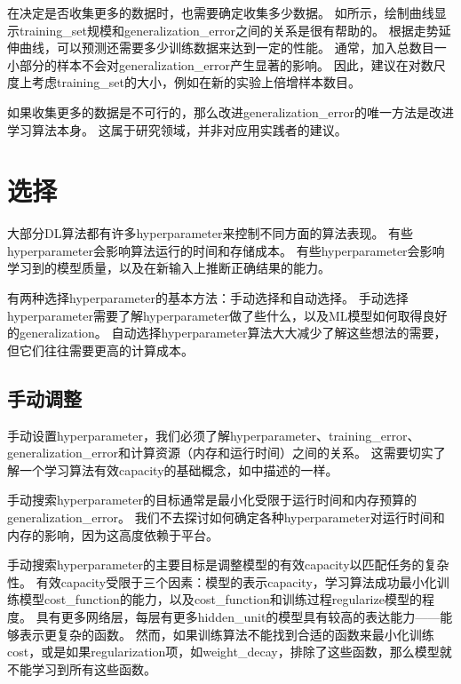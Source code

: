 在决定是否收集更多的数据时，也需要确定收集多少数据。
如所示，绘制曲线显示\gls{training_set}规模和\gls{generalization_error}之间的关系是很有帮助的。
根据走势延伸曲线，可以预测还需要多少训练数据来达到一定的性能。
通常，加入总数目一小部分的样本不会对\gls{generalization_error}产生显著的影响。
因此，建议在对数尺度上考虑\gls{training_set}的大小，例如在新的实验上倍增样本数目。


如果收集更多的数据是不可行的，那么改进\gls{generalization_error}的唯一方法是改进学习算法本身。
这属于研究领域，并非对应用实践者的建议。

\section{选择}
\label{sec:selecting_hyperparameters}
大部分\gls{DL}算法都有许多\gls{hyperparameter}来控制不同方面的算法表现。
有些\gls{hyperparameter}会影响算法运行的时间和存储成本。
有些\gls{hyperparameter}会影响学习到的模型质量，以及在新输入上推断正确结果的能力。


有两种选择\gls{hyperparameter}的基本方法：手动选择和自动选择。
手动选择\gls{hyperparameter}需要了解\gls{hyperparameter}做了些什么，以及\gls{ML}模型如何取得良好的\gls{generalization}。
自动选择\gls{hyperparameter}算法大大减少了解这些想法的需要，但它们往往需要更高的计算成本。


\subsection{手动调整}
\label{sec:manual_hyperparameter_tuning}
手动设置\gls{hyperparameter}，我们必须了解\gls{hyperparameter}、\gls{training_error}、\gls{generalization_error}和计算资源（内存和运行时间）之间的关系。
这需要切实了解一个学习算法有效\gls{capacity}的基础概念，如中描述的一样。


手动搜索\gls{hyperparameter}的目标通常是最小化受限于运行时间和内存预算的\gls{generalization_error}。
我们不去探讨如何确定各种\gls{hyperparameter}对运行时间和内存的影响，因为这高度依赖于平台。


手动搜索\gls{hyperparameter}的主要目标是调整模型的有效\gls{capacity}以匹配任务的复杂性。
有效\gls{capacity}受限于三个因素：模型的表示\gls{capacity}，学习算法成功最小化训练模型\gls{cost_function}的能力，以及\gls{cost_function}和训练过程\gls{regularize}模型的程度。
具有更多网络层，每层有更多\gls{hidden_unit}的模型具有较高的表达能力——能够表示更复杂的函数。
然而，如果训练算法不能找到合适的函数来最小化训练\gls{cost}，或是如果\gls{regularization}项，如\gls{weight_decay}，排除了这些函数，那么模型就不能学习到所有这些函数。%


